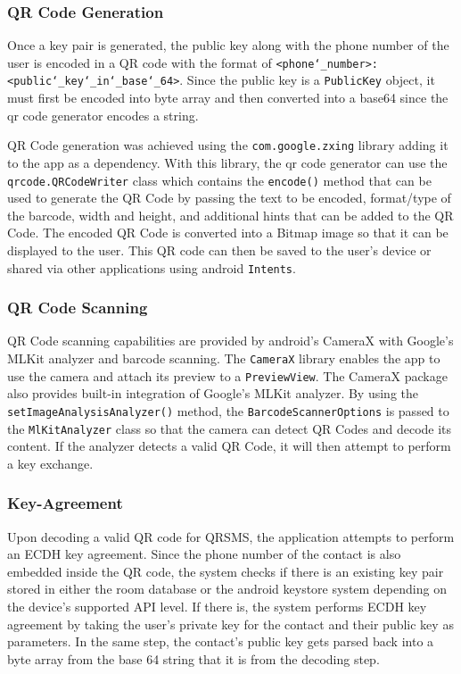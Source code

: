 \documentclass{report}
\begin{document}
\subsubsection{QR Code Generation}
Once a key pair is generated, the public key along with the phone number
of the user is encoded in a QR code with the format of
\texttt{<phone\char`_number>:<public\char`_key\char`_in\char`_base\char`_64>}.
Since the public key is a \texttt{PublicKey} object, it must first be
encoded into byte array and then converted into a base64 since the qr code generator encodes a string.

QR Code generation was achieved using the \texttt{com.google.zxing} library
adding it to the app as a dependency. With this library, the qr code
generator can use the \texttt{qrcode.QRCodeWriter} class which contains
the \texttt{encode()} method that can be used to generate the QR Code by
passing the text to be encoded, format/type of the barcode, width
and height, and additional hints that can be added to the QR Code.
The encoded QR Code is converted into a Bitmap image so that it can be displayed to the user. This QR code can then be saved to the user's device or shared via other
applications using android \texttt{Intents}.

\subsubsection{QR Code Scanning}
QR Code scanning capabilities are provided by android's CameraX with Google's MLKit analyzer and barcode scanning. The \texttt{CameraX} library enables the app to use the camera and attach its preview to a \texttt{PreviewView}. The CameraX
package also provides built-in integration of Google's MLKit analyzer.
By using the \texttt{setImageAnalysi\newline sAnalyzer()} method, the
\texttt{BarcodeScannerOptions} is passed to the \lstinline{MlKitAnalyzer}
class so that the camera can detect QR Codes and decode its content. If the
analyzer detects a valid QR Code, it will then attempt to perform
a key exchange.

\subsubsection{Key-Agreement}
Upon decoding a valid QR code for QRSMS, the application attempts to perform an ECDH key agreement. Since the phone number of the contact is also embedded inside the QR code, the system checks if there is an existing key pair stored in either the room database or the android keystore system depending on the device's supported API level. If there is, the system performs ECDH key agreement by taking the user's private key for the contact and their public key as parameters. In the same step, the contact's public key gets parsed back into a byte array from the base 64 string that it is from the decoding step.
\end{document}
